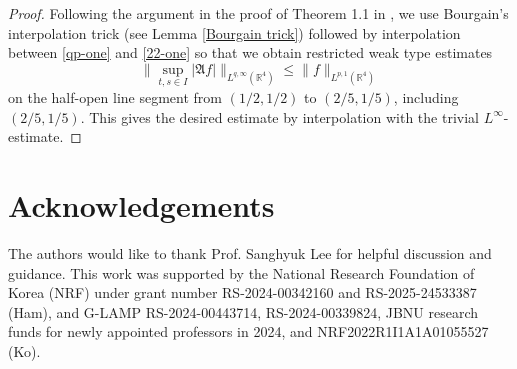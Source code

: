 \documentclass[10pt] %
{amsart}
\theoremstyle{plain}
\numberwithin{equation}{section}
\begin{document}
\begin{proof}
Following the argument in the proof of Theorem 1.1 in \cite{Lee}, 
we use Bourgain's interpolation trick (see Lemma \ref{Bourgain trick}) followed by interpolation between \eqref{qp-one} and \eqref{22-one} so that we obtain restricted weak type estimates 
\[
\big\| \sup_{t,s\in I} | \mathfrak A  f| \big\|_{L^{q,\infty} (\mathbb R^4)} \le   \|f\|_{L^{p,1}(\mathbb R^4)} 
\]
on the half-open line segment from $(1/2,1/2)$ to $(2/5,1/5)$, including $(2/5,1/5)$. 
This gives the desired estimate by interpolation with the trivial $L^\infty$-estimate. 
\end{proof}



\section*{Acknowledgements}
The authors would like to thank Prof. Sanghyuk Lee for helpful discussion and guidance.
This work was supported by the National Research Foundation of Korea (NRF) under grant number RS-2024-00342160 and RS-2025-24533387 (Ham), and G-LAMP RS-2024-00443714, RS-2024-00339824, JBNU research funds for newly appointed professors in 2024, and NRF2022R1I1A1A01055527 (Ko). 
\end{document}
